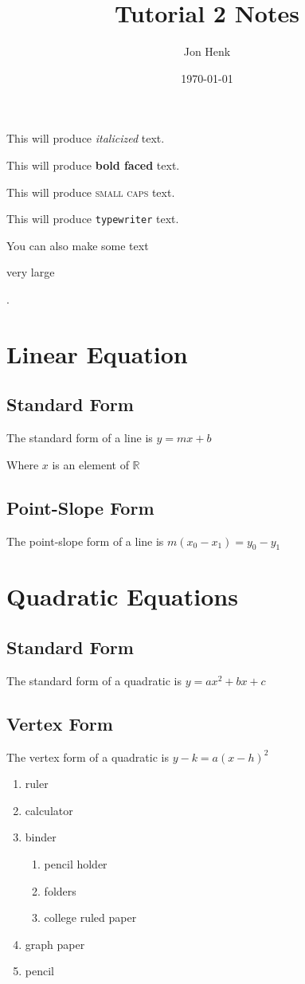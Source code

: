 \documentclass[12pt]{article}
\begin{document}
\title{Tutorial 2 Notes}
\author{Jon Henk}
\date{\today}
\maketitle

This will produce \textit{italicized} text.

This will produce \textbf{bold faced} text.

\begin{center}This will produce \textsc{small caps} text.\end{center}

\begin{flushright}This will produce \texttt{typewriter} text.\end{flushright}

\begin{flushleft}
 You can also make some text \begin{large}very large\end{large}.
\end{flushleft}

\section{Linear Equation}
	\subsection{Standard Form}
	The standard form of a line is $y=mx+b$
	
	Where $x$ is an element of $\mathbb{R}$
	\subsection{Point-Slope Form}
	The point-slope form of a line is $m(x_0-x_1)=y_0-y_1$
\section{Quadratic Equations}
	\subsection{Standard Form}
	The standard form of a quadratic is $y=ax^2+bx+c$
	\subsection{Vertex Form}
	The vertex form of a quadratic is $y-k=a(x-h)^2$

\begin{enumerate}
\item ruler
\item calculator
\item binder
	\begin{enumerate}
	\item pencil holder
	\item folders
	\item college ruled paper
	\end{enumerate}
\item graph paper
\item pencil
\end{enumerate}
\end{document}
